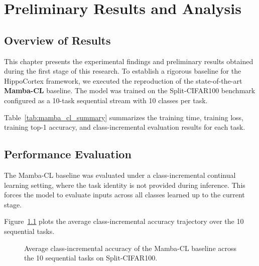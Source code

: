 

\chapter{Preliminary Results and Analysis}
\label{chap:results}

\section{Overview of Results}
\label{sec:results_overview}

This chapter presents the experimental findings and preliminary results obtained during the first stage of this research. To establish a rigorous baseline for the HippoCortex framework, we executed the reproduction of the state-of-the-art \textbf{Mamba-CL} \cite{chengMambaCLOptimizingSelective2025} baseline. The model was trained on the Split-CIFAR100 benchmark \cite{venThreeScenariosContinual2019} configured as a 10-task sequential stream with 10 classes per task. 

Table~\ref{tab:mamba_cl_summary} summarizes the training time, training loss, training top-1 accuracy, and class-incremental evaluation results for each task.



\section{Performance Evaluation}
\label{sec:performance_results}

The Mamba-CL baseline was evaluated under a class-incremental continual learning setting, where the task identity is not provided during inference. This forces the model to evaluate inputs across all classes learned up to the current stage.

Figure~\ref{fig:results_comparison} plots the average class-incremental accuracy trajectory over the 10 sequential tasks.

\begin{figure}[ht]
    \centering
    
    \caption{Average class-incremental accuracy of the Mamba-CL baseline across the 10 sequential tasks on Split-CIFAR100.}
    \label{fig:results_comparison}
\end{figure}


